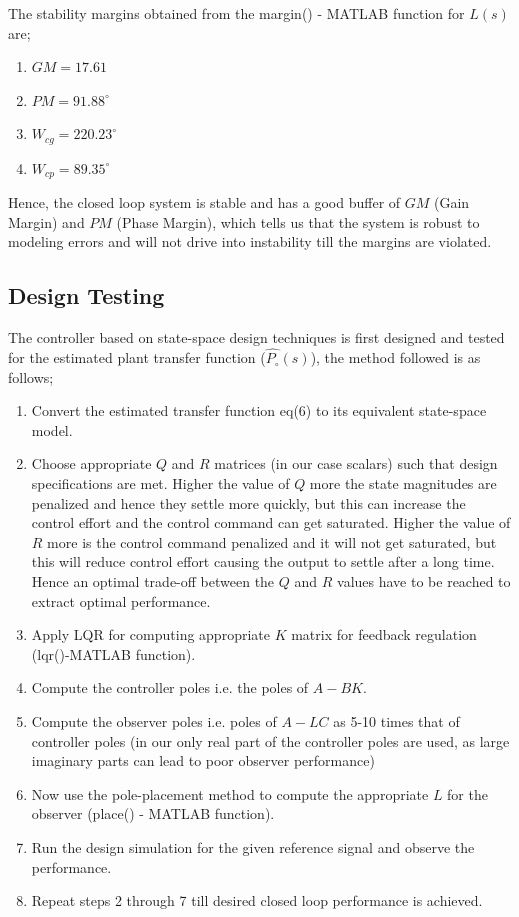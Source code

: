 \documentclass[11pt,usenames]{article}
\begin{document}
The stability margins obtained from the margin() - MATLAB function for $L(s)$ are;

\begin{enumerate}
	\item $GM = 17.61$
	\item $PM = 91.88^{\circ}$
	\item $W_{cg} = 220.23^{\circ}$
	\item $W_{cp} = 89.35^{\circ}$
\end{enumerate}

Hence, the closed loop system is stable and has a good buffer of $GM$ (Gain Margin) and $PM$ (Phase Margin), which tells us that the system is robust to modeling errors and will not drive into instability till the margins are violated.

\subsection{Design Testing}
The controller based on state-space design techniques is first designed and tested for the estimated plant transfer function ($\hat{P_{\circ}}(s)$), the method followed is as follows;

\begin{enumerate}
	\item Convert the estimated transfer function eq(6) to its equivalent state-space model.
	\item Choose appropriate $Q$ and $R$ matrices (in our case scalars) such that design specifications are met. Higher the value of $Q$ more the state magnitudes are penalized and hence they settle more quickly, but this can increase the control effort and the control command can get saturated. Higher the value of $R$ more is the control command penalized and it will not get saturated, but this will reduce control effort causing the output to settle after a long time. Hence an optimal trade-off between the  $Q$ and $R$ values have to be reached to extract optimal performance.
	\item Apply LQR for computing appropriate $K$ matrix for feedback regulation (lqr()-MATLAB function).
	\item Compute the controller poles i.e. the poles of $A-BK$.
	\item Compute the observer poles i.e. poles of $A-LC$ as 5-10 times that of controller poles (in our only real part of the controller poles are used, as large imaginary parts can lead to poor observer performance)
	\item Now use the pole-placement method to compute the appropriate $L$ for the observer (place() - MATLAB function).
	\item Run the design simulation for the given reference signal and observe the performance.
	\item Repeat steps 2 through 7 till desired closed loop performance is achieved.	
\end{enumerate}
\end{document}
